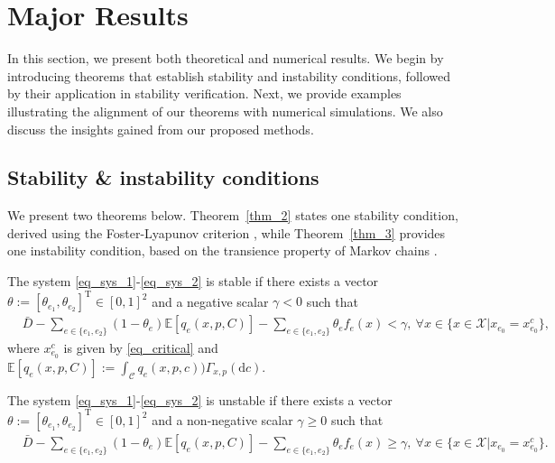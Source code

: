 \section{Major Results}
In this section, we present both theoretical and numerical results. We begin by introducing theorems that establish stability and instability conditions, followed by their application in stability verification. Next, we provide examples illustrating the alignment of our theorems with numerical simulations. We also discuss the insights gained from our proposed methods. 

\subsection{Stability \& instability conditions}

We present two theorems below. Theorem~\ref{thm_2} states one stability condition, derived using the Foster-Lyapunov criterion \cite{meyn2012markov}, while Theorem~\ref{thm_3} provides one instability condition, based on the transience property of Markov chains \cite{meyn2012markov}.
\begin{thm}
\label{thm_2}
The system \eqref{eq_sys_1}-\eqref{eq_sys_2} is stable if there exists a vector $\theta:=[\theta_{e_1},\theta_{e_2}]^{\mathrm{T}}\in[0, 1]^2$ and a negative scalar $\gamma<0$ such that
\begin{align}
    &\bar{D}- \sum_{e\in\{e_1,e_2\}} (1-\theta_{e})\mathbb{E}[q_{e}(x, p, C)]- \sum_{e\in\{e_1,e_2\}}\theta_e f_e(x) < \gamma, ~\forall x \in\{x\in\mathcal{X}|x_{e_0}=x_{e_0}^c\}, 
    \label{eq_thm2_1}
\end{align}
where $x_{e_0}^c$ is given by \eqref{eq_critical} and $\mathbb{E}[q_{e}(x, p, C)] := \int_{\mathcal{C}} q_{e}(x, p, c)) \Gamma_{x,p}(\mathrm{d}c)$.
\end{thm}

\begin{thm}
\label{thm_3}
The system \eqref{eq_sys_1}-\eqref{eq_sys_2} is unstable if there exists a vector $\theta:=[\theta_{e_1},\theta_{e_2}]^{\mathrm{T}}\in[0,1]^2$ and a non-negative scalar $\gamma\geq0$ such that
\begin{align}
    &\bar{D}- \sum_{e\in\{e_1,e_2\}} (1-\theta_{e})\mathbb{E}[q_{e}(x, p, C)] - \sum_{e\in\{e_1,e_2\}}\theta_{e} f_{e}(x) \geq \gamma, ~\forall x \in\{x\in\mathcal{X}|x_{e_0}=x_{e_0}^c\}. \label{eq_thm3_1}
\end{align}
\end{thm}


